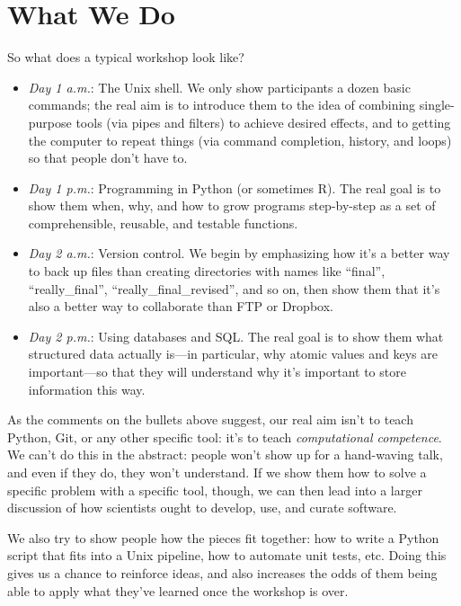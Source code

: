 \documentclass[10pt,a4paper,twocolumn]{article}
\begin{document}
\section*{What We Do}

So what does a typical workshop look like?

\begin{itemize}
\item
  \emph{Day 1 a.m.}: The Unix shell. We only show participants a dozen
  basic commands; the real aim is to introduce them to the idea of
  combining single-purpose tools (via pipes and filters) to achieve
  desired effects, and to getting the computer to repeat things (via
  command completion, history, and loops) so that people don't have
  to.
\item
  \emph{Day 1 p.m.}: Programming in Python (or sometimes R). The real
  goal is to show them when, why, and how to grow programs
  step-by-step as a set of comprehensible, reusable, and testable
  functions.
\item
  \emph{Day 2 a.m.}: Version control. We begin by emphasizing how it's
  a better way to back up files than creating directories with names
  like ``final'', ``really\_final'', ``really\_final\_revised'', and
  so on, then show them that it's also a better way to collaborate
  than FTP or Dropbox.
\item
  \emph{Day 2 p.m.}: Using databases and SQL.  The real goal is to
  show them what structured data actually is---in particular, why
  atomic values and keys are important---so that they will understand
  why it's important to store information this way.
\end{itemize}

As the comments on the bullets above suggest, our real aim isn't to
teach Python, Git, or any other specific tool: it's to teach
\emph{computational competence}. We can't do this in the abstract:
people won't show up for a hand-waving talk, and even if they do, they
won't understand. If we show them how to solve a specific problem with
a specific tool, though, we can then lead into a larger discussion of
how scientists ought to develop, use, and curate software.

We also try to show people how the pieces fit together: how to write a
Python script that fits into a Unix pipeline, how to automate unit
tests, etc. Doing this gives us a chance to reinforce ideas, and also
increases the odds of them being able to apply what they've learned
once the workshop is over.
\end{document}

